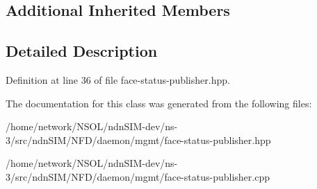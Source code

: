 \subsection*{Additional Inherited Members}


\subsection{Detailed Description}


Definition at line 36 of file face-\/status-\/publisher.\+hpp.



The documentation for this class was generated from the following files\+:\begin{DoxyCompactItemize}
\item 
/home/network/\+N\+S\+O\+L/ndn\+S\+I\+M-\/dev/ns-\/3/src/ndn\+S\+I\+M/\+N\+F\+D/daemon/mgmt/face-\/status-\/publisher.\+hpp\item 
/home/network/\+N\+S\+O\+L/ndn\+S\+I\+M-\/dev/ns-\/3/src/ndn\+S\+I\+M/\+N\+F\+D/daemon/mgmt/face-\/status-\/publisher.\+cpp\end{DoxyCompactItemize}
